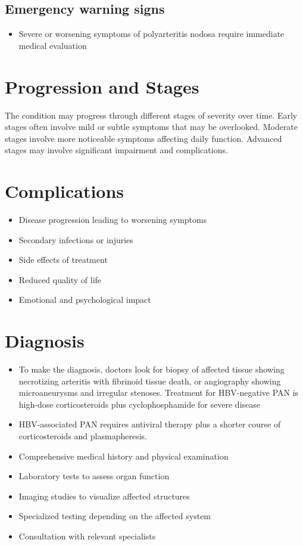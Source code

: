 \subsection{Emergency warning signs}
\begin{itemize}[noitemsep]
  \item Severe or worsening symptoms of polyarteritis nodosa require immediate medical evaluation
\end{itemize}
\section{Progression and Stages}
The condition may progress through different stages of severity over time. Early stages often involve mild or subtle symptoms that may be overlooked. Moderate stages involve more noticeable symptoms affecting daily function. Advanced stages may involve significant impairment and complications.
\section{Complications}
\begin{itemize}[noitemsep]
  \item Disease progression leading to worsening symptoms
  \item Secondary infections or injuries
  \item Side effects of treatment
  \item Reduced quality of life
  \item Emotional and psychological impact
\end{itemize}
\section{Diagnosis}
\begin{itemize}[noitemsep]
  \item To make the diagnosis, doctors look for biopsy of affected tissue showing necrotizing arteritis with fibrinoid tissue death, or angiography showing microaneurysms and irregular stenoses. Treatment for HBV-negative PAN is high-dose corticosteroids plus cyclophosphamide for severe disease
  \item HBV-associated PAN requires antiviral therapy plus a shorter course of corticosteroids and plasmapheresis.
  \item Comprehensive medical history and physical examination
  \item Laboratory tests to assess organ function
  \item Imaging studies to visualize affected structures
  \item Specialized testing depending on the affected system
  \item Consultation with relevant specialists
\end{itemize}
